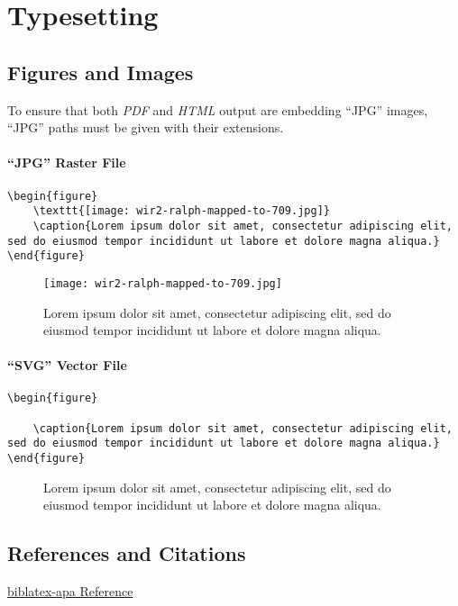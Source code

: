 \chapter{Typesetting}

\section{Figures and Images}

To ensure that both \textit{PDF} and \textit{HTML} output are embedding
``JPG'' images, ``JPG'' paths must be given with their extensions.

\subsubsection{``JPG'' Raster File}

\begin{lstlisting}[caption=Embedding a ``JPG'' raster file.]
\begin{figure}
    \texttt{[image: wir2-ralph-mapped-to-709.jpg]}
    \caption{Lorem ipsum dolor sit amet, consectetur adipiscing elit, sed do eiusmod tempor incididunt ut labore et dolore magna aliqua.}
\end{figure}
\end{lstlisting}

\begin{figure}
    \texttt{[image: wir2-ralph-mapped-to-709.jpg]}
    \caption{Lorem ipsum dolor sit amet, consectetur adipiscing elit, sed do eiusmod tempor incididunt ut labore et dolore magna aliqua.}
\end{figure}

\subsubsection{``SVG'' Vector File}

\begin{lstlisting}[caption=Embedding a ``SVG'' vector file.]
\begin{figure}
    
    \caption{Lorem ipsum dolor sit amet, consectetur adipiscing elit, sed do eiusmod tempor incididunt ut labore et dolore magna aliqua.}
\end{figure}
\end{lstlisting}

\begin{figure}
    
    \caption{Lorem ipsum dolor sit amet, consectetur adipiscing elit, sed do eiusmod tempor incididunt ut labore et dolore magna aliqua.}
\end{figure}

\section{References and Citations}

\href{https://ctan.org/pkg/biblatex-apa}{biblatex-apa Reference}

\textcite{ARRI2012a}

\textcite{ARRI2012a,Barlow1964}

\parencite{ARRI2012a}

\parencite{ARRI2012a,Barlow1964}
